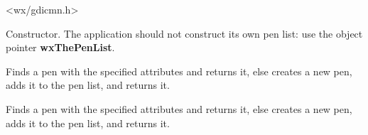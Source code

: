 <wx/gdicmn.h>


\label{wxpenlistctor}


Constructor. The application should not construct its own pen list:
use the object pointer {\bf wxThePenList}.

\label{wxpenlistfindorcreatepen}


Finds a pen with the specified attributes and returns it, else creates a new pen, adds it
to the pen list, and returns it.


Finds a pen with the specified attributes and returns it, else creates a new pen, adds it
to the pen list, and returns it.






